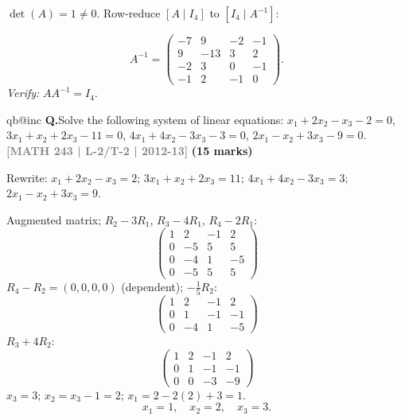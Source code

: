 \documentclass[12pt,a3paper]{article}
\makeatletter
\newcommand{\yr}[1]{\hfill\textcolor{gray}{\small\textbf{[#1]}}}
\newcommand{\mk}[1]{\textcolor{orange!70!black}{\small\textbf{(#1 marks)}}}
\newcounter{qnum}
\newcommand{\Q}[1]{%
  \csname qb@inc\endcsname
  \needspace{4\baselineskip}
  \refstepcounter{qnum}
  \vspace{6pt}
  \noindent\textbf{Q\theqnum.}\enspace #1\par
}
\makeatother
\begin{document}
\begin{tcolorbox}[enhanced,breakable,colback=cB!4,colframe=cB,
  boxrule=0.8pt,arc=5pt,
  title={\textbf{Answer --- Inverse of $A=\begin{pmatrix}1&2&3&4\\2&3&4&5\\3&4&5&5\\4&5&5&7\end{pmatrix}$}},
  fonttitle=\bfseries\color{white},colbacktitle=cB]

$\det(A)=1\neq0$. Row-reduce $[A\mid I_4]$ to $[I_4\mid A^{-1}]$:

\[
\boxed{A^{-1}=\begin{pmatrix}-7&9&-2&-1\\9&-13&3&2\\-2&3&0&-1\\-1&2&-1&0\end{pmatrix}.}
\]
\textit{Verify:} $AA^{-1}=I_4$.\;\checkmark

\end{tcolorbox}

\Q{Solve the following system of linear equations:
$x_1 + 2x_2 - x_3 - 2 = 0$, \quad $3x_1 + x_2 + 2x_3 - 11 = 0$, \quad $4x_1 + 4x_2 - 3x_3 - 3 = 0$, \quad $2x_1 - x_2 + 3x_3 - 9 = 0$.
\yr{MATH 243 | L-2/T-2 | 2012-13} \mk{15}}

\begin{tcolorbox}[enhanced,breakable,
  colback=cB!4,colframe=cB,boxrule=0.8pt,arc=5pt,
  title={\textbf{Answer --- Solve: $x_1+2x_2-x_3=2$, $3x_1+x_2+2x_3=11$, etc.}},
  fonttitle=\bfseries\color{white},colbacktitle=cB]

Rewrite: $x_1+2x_2-x_3=2$;\; $3x_1+x_2+2x_3=11$;\; $4x_1+4x_2-3x_3=3$;\; $2x_1-x_2+3x_3=9$.

Augmented matrix; $R_2-3R_1$, $R_3-4R_1$, $R_4-2R_1$:
\[
\begin{pmatrix}1&2&-1&2\\0&-5&5&5\\0&-4&1&-5\\0&-5&5&5\end{pmatrix}
\]
$R_4-R_2=(0,0,0,0)$ (dependent); $-\frac{1}{5}R_2$:
\[
\begin{pmatrix}1&2&-1&2\\0&1&-1&-1\\0&-4&1&-5\end{pmatrix}
\]
$R_3+4R_2$:
\[
\begin{pmatrix}1&2&-1&2\\0&1&-1&-1\\0&0&-3&-9\end{pmatrix}
\]
$x_3=3$; $x_2=x_3-1=2$; $x_1=2-2(2)+3=1$.
\[
\boxed{x_1=1,\quad x_2=2,\quad x_3=3.}
\]

\end{tcolorbox}
\end{document}
